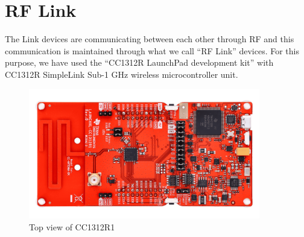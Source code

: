 \chapter{RF Link}
The Link devices are communicating between each other through RF and this communication is maintained through what we call “RF Link” devices.  For this purpose, we have used the “CC1312R LaunchPad development kit” with CC1312R SimpleLink Sub-1 GHz wireless microcontroller unit. 

\begin{figure}[H]
\begin{center}
\includegraphics[width=0.90\textwidth]{cc1312r1-top}
\end{center}
\caption{Top view of CC1312R1}
\label{fig-pin}
\end{figure}

